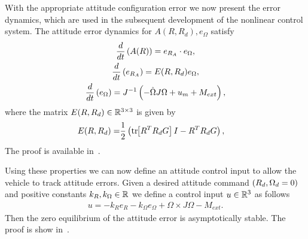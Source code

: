 \documentclass[journal]{new-aiaa}
\begin{document}
With the appropriate attitude configuration error we now present the error dynamics, which are used in the subsequent development of the nonlinear control system.
The attitude error dynamics for \( A(R, R_d), e_\Omega \) satisfy
\begin{gather}
    \frac{d }{d t} \left( A(R) \right) = e_{R_A} \cdot e_\Omega , \label{eq:A_dot} \\
    \frac{d }{d t} \left( e_{R_A} \right) = E(R, R_d) e_\Omega , \label{eq:eRA_dot} \\
    \frac{d }{d t} \left( e_\Omega \right) = J^{-1} \left( -\hat{\Omega} J \Omega + u_m + M_{ext} \right) , \label{eq:eW_dot}
\end{gather}
where the matrix \(E(R,R_d)\in \mathbb{R}^{3\times3} \) is given by
\begin{align}
    E(R,R_d) = &\frac{1}{2} \left( \mathrm{tr}\negthickspace\left[ R^T R_d G \right]I - R^T R_d G \right) , \label{eq:E}
\end{align}
The proof is available in~\cite{kulumani2017a}.

Using these properties we can now define an attitude control input to allow the vehicle to track attitude errors.
Given a desired attitude command \( \left( R_d, \Omega_d = 0 \right) \) and positive constants \( k_R, k_\Omega \in \mathbb{R} \) we define a control input \( u \in \mathbb{R}^3 \) as follows
\begin{gather}
    u = -k_R e_R - k_\Omega e_\Omega + \Omega \times J \Omega - M_{ext}. \label{eqn:nodist_control}
\end{gather}
Then the zero equilibrium of the attitude error is asymptotically stable.
The proof is show in~\cite{kulumani2017a}.
\end{document}
